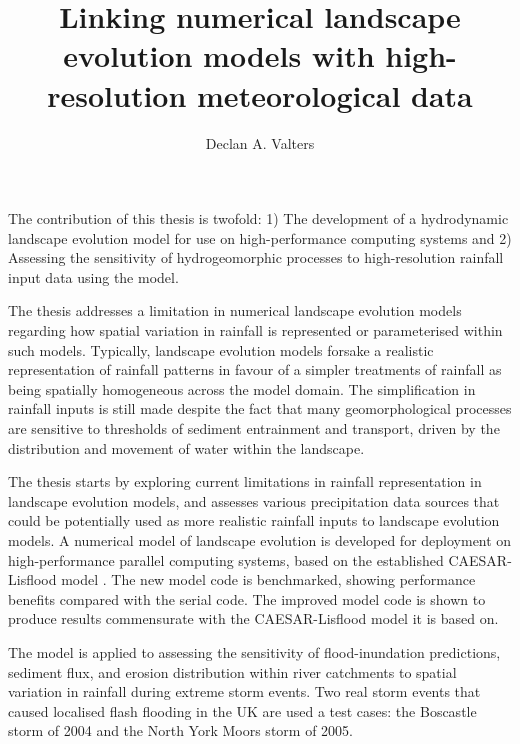 \title{Linking numerical landscape evolution models with high-resolution meteorological data}

\author{Declan A. Valters}
\def\wordcount{xxxxx}




\beforeabstract
The contribution of this thesis is twofold: 1) The development of a hydrodynamic landscape evolution model for use on high-performance computing systems and 2) Assessing the sensitivity of hydrogeomorphic processes to high-resolution rainfall input data using the model.

The thesis addresses a limitation in numerical landscape evolution models regarding how spatial variation in rainfall is represented or parameterised within such models. Typically, landscape evolution models forsake a realistic representation of rainfall patterns in favour of a simpler treatments of rainfall as being spatially homogeneous across the model domain. The simplification in rainfall inputs is still made despite the fact that many geomorphological processes are sensitive to thresholds of sediment entrainment and transport, driven by the distribution and movement of water within the landscape. 

The thesis starts by exploring current limitations in rainfall representation in landscape evolution models, and assesses various precipitation data sources that could be potentially used as more realistic rainfall inputs to landscape evolution models. A numerical model of landscape evolution is developed for deployment on high-performance parallel computing systems, based on the established CAESAR-Lisflood model \citep{Coulthard2013}. The new model code is benchmarked, showing performance benefits compared with the serial code. The improved model code is shown to produce results commensurate with the CAESAR-Lisflood model it is based on.

The model is applied to assessing the sensitivity of flood-inundation predictions, sediment flux, and erosion distribution within river catchments to spatial variation in rainfall during extreme storm events. Two real storm events that caused localised flash flooding in the UK are used a test cases: the Boscastle storm of 2004 and the North York Moors storm of 2005. 

